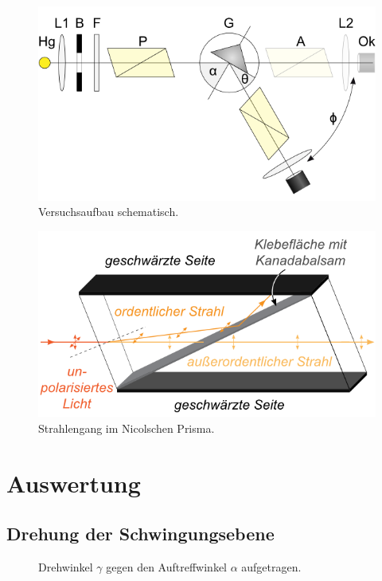 \documentclass[12pt,a4paper,titlepage,headinclude,bibtotoc]{scrartcl}
\begin{document}
\begin{figure}[!h]
	\centering
	\includegraphics[scale=0.7]{aufbau_schema.png}
	\caption{Versuchsaufbau schematisch. \cite[Datum: 23.03.2015]{LP20}}
	\label{fig:aufbau}
\end{figure}
\begin{figure}[!h]
	\centering
	\includegraphics[scale=0.7]{nicol.png}
	\caption{Strahlengang im Nicolschen Prisma. \cite[Datum: 23.03.2015]{LP20}}
	\label{fig:nicol}
\end{figure}

\section{Auswertung}
\label{sec:auswertung}
\subsection{Drehung der Schwingungsebene}
\begin{figure}[!htb]
	\centering
	
	\caption{Drehwinkel $\gamma$ gegen den Auftreffwinkel $\alpha$ aufgetragen.}
\end{figure}
\end{document}
